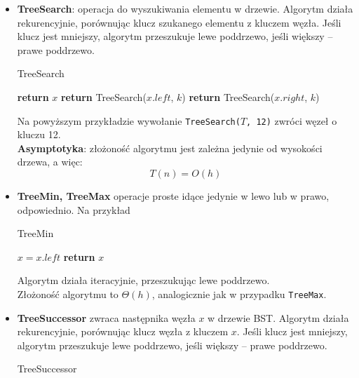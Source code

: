 \documentclass[11pt,a4paper]{article}
\begin{document}
\begin{itemize}
    \item \textbf{TreeSearch}: operacja do wyszukiwania elementu w drzewie. Algorytm działa rekurencyjnie, porównując klucz szukanego elementu z kluczem węzła. Jeśli klucz jest mniejszy, algorytm przeszukuje lewe poddrzewo, jeśli większy -- prawe poddrzewo. \\
        \begin{algorithm}
            \caption{TreeSearch}
            \begin{algorithmic}[1]
                    \State \textbf{return} $x$
                    \State \textbf{return} TreeSearch($x.left$, $k$)
                \Else
                    \State \textbf{return} TreeSearch($x.right$, $k$)
                \EndIf
                \EndProcedure
            \end{algorithmic}
        \end{algorithm}
        Na powyższym przykładzie wywołanie \texttt{TreeSearch($T$, 12)} zwróci węzeł o kluczu 12.\\
        \textbf{Asymptotyka}: złożoność algorytmu jest zależna jedynie od wysokości drzewa, a więc:
        \[
            T(n) = O(h)
        \]
    \item \textbf{TreeMin, TreeMax} operacje proste idące jedynie w lewo lub w prawo, odpowiednio. Na przykład
        \begin{algorithm}
            \caption{TreeMin}
            \begin{algorithmic}[1]
                    \State $x = x.left$
                \EndWhile
                \State \textbf{return} $x$
                \EndProcedure
            \end{algorithmic}
        \end{algorithm}
        Algorytm działa iteracyjnie, przeszukując lewe poddrzewo.\\
        Złożoność algorytmu to $\Theta(h)$, analogicznie jak w przypadku \texttt{TreeMax}.
    \item \textbf{TreeSuccessor} zwraca następnika węzła $x$ w drzewie BST. Algorytm działa rekurencyjnie, porównując klucz węzła z kluczem $x$. Jeśli klucz jest mniejszy, algorytm przeszukuje lewe poddrzewo, jeśli większy -- prawe poddrzewo. \\
        \begin{algorithm}
           \caption{TreeSuccessor}

\end{algorithm}
\end{itemize}
\end{document}
